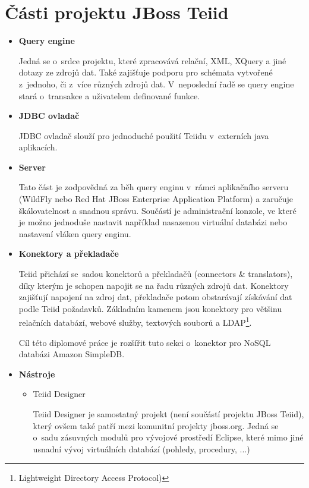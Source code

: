 \documentclass[oneside,12pt,final]{fithesis2}
\begin{document}
\section{Části projektu JBoss Teiid}
\begin{itemize}
 \item \textbf{Query engine}
 
 Jedná se o~srdce projektu, které zpracovává relační, XML, XQuery a jiné dotazy ze zdrojů dat. Také zajišťuje podporu pro schémata vytvořené z~jednoho, či z~více různých zdrojů dat. V~neposlední řadě se query engine stará o~transakce a uživatelem definované funkce.
 
 \item \textbf{JDBC ovladač}
 
 JDBC ovladač slouží pro jednoduché použití Teiidu v~externích java aplikacích.
 
 \item \textbf{Server}
 
 Tato část je zodpovědná za běh query enginu v~rámci aplikačního serveru (WildFly nebo Red Hat JBoss Enterprise Application Platform) a zaručuje škálovatelnost a snadnou správu. Součástí je administrační konzole, ve které je možno jednoduše nastavit například nasazenou virtuální databázi nebo nastavení vláken query enginu.
 \vspace{10mm}
 \item \textbf{Konektory a překladače}

 Teiid přichází se~sadou konektorů a překladačů (connectors \& translators), díky kterým je schopen napojit se na řadu různých zdrojů dat. Konektory zajišťují napojení na zdroj dat, překladače potom obstarávají získávání dat podle Teiid požadavků. Základním kamenem jsou konektory pro většinu relačních databází, webové služby, textových souborů a LDAP\footnote{Lightweight Directory Access Protocol)}.
 
 Cíl této diplomové práce je rozšířit tuto sekci o~konektor pro NoSQL databázi Amazon SimpleDB.
 
 \item \textbf{Nástroje}
 
  \begin{itemize}
  \item Teiid Designer
  
  Teiid Designer je samostatný projekt (není součástí projektu JBoss Teiid), který ovšem také patří mezi komunitní projekty jboss.org. Jedná se o~sadu zásuvných modulů pro vývojové prostředí Eclipse, které mimo jiné usnadní vývoj virtuálních databází (pohledy, procedury, ...)
  

\end{itemize}
\end{itemize}
\end{document}
